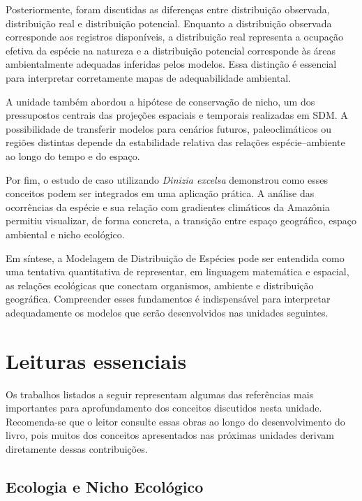 Posteriormente, foram discutidas as diferenças entre distribuição observada, distribuição real e distribuição potencial. Enquanto a distribuição observada corresponde aos registros disponíveis, a distribuição real representa a ocupação efetiva da espécie na natureza e a distribuição potencial corresponde às áreas ambientalmente adequadas inferidas pelos modelos. Essa distinção é essencial para interpretar corretamente mapas de adequabilidade ambiental.

A unidade também abordou a hipótese de conservação de nicho, um dos pressupostos centrais das projeções espaciais e temporais realizadas em SDM. A possibilidade de transferir modelos para cenários futuros, paleoclimáticos ou regiões distintas depende da estabilidade relativa das relações espécie--ambiente ao longo do tempo e do espaço.

Por fim, o estudo de caso utilizando \textit{Dinizia excelsa} demonstrou como esses conceitos podem ser integrados em uma aplicação prática. A análise das ocorrências da espécie e sua relação com gradientes climáticos da Amazônia permitiu visualizar, de forma concreta, a transição entre espaço geográfico, espaço ambiental e nicho ecológico.

Em síntese, a Modelagem de Distribuição de Espécies pode ser entendida como uma tentativa quantitativa de representar, em linguagem matemática e espacial, as relações ecológicas que conectam organismos, ambiente e distribuição geográfica. Compreender esses fundamentos é indispensável para interpretar adequadamente os modelos que serão desenvolvidos nas unidades seguintes.

\section{Leituras essenciais}

Os trabalhos listados a seguir representam algumas das referências mais importantes para aprofundamento dos conceitos discutidos nesta unidade. Recomenda-se que o leitor consulte essas obras ao longo do desenvolvimento do livro, pois muitos dos conceitos apresentados nas próximas unidades derivam diretamente dessas contribuições.

\subsection*{Ecologia e Nicho Ecológico}

